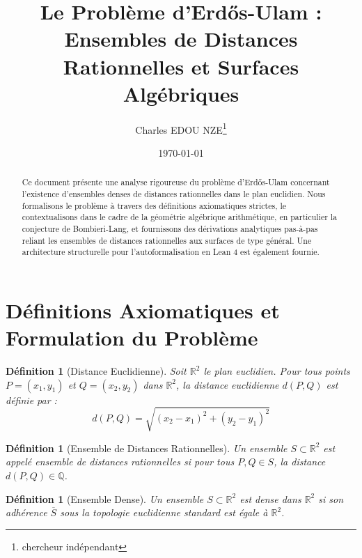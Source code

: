 \documentclass[12pt,a4paper]{article}
\title{Le Probl\`eme d'Erd\H{o}s-Ulam : Ensembles de Distances Rationnelles et Surfaces Alg\'ebriques}
\author{Charles EDOU NZE\thanks{chercheur ind\'ependant}}
\date{\today}
\newtheorem{definition}[theorem]{D\'efinition}
\begin{document}
\maketitle
\thispagestyle{fancy}
\fancyhf{}
\renewcommand{\headrulewidth}{0pt}

\begin{abstract}
Ce document pr\'esente une analyse rigoureuse du probl\`eme d'Erd\H{o}s-Ulam concernant l'existence d'ensembles denses de distances rationnelles dans le plan euclidien. Nous formalisons le probl\`eme \`a travers des d\'efinitions axiomatiques strictes, le contextualisons dans le cadre de la g\'eom\'etrie alg\'ebrique arithm\'etique, en particulier la conjecture de Bombieri-Lang, et fournissons des d\'erivations analytiques pas-\`a-pas reliant les ensembles de distances rationnelles aux surfaces de type g\'en\'eral. Une architecture structurelle pour l'autoformalisation en Lean 4 est \'egalement fournie.
\end{abstract}

\tableofcontents
\newpage

\section{D\'efinitions Axiomatiques et Formulation du Probl\`eme}

\begin{definition}[Distance Euclidienne]
Soit $\mathbb{R}^2$ le plan euclidien. Pour tous points $P = (x_1, y_1)$ et $Q = (x_2, y_2)$ dans $\mathbb{R}^2$, la distance euclidienne $d(P, Q)$ est d\'efinie par :
\begin{equation}
d(P, Q) = \sqrt{(x_2 - x_1)^2 + (y_2 - y_1)^2}
\end{equation}
\end{definition}

\begin{definition}[Ensemble de Distances Rationnelles]
Un ensemble $S \subset \mathbb{R}^2$ est appel\'e \textit{ensemble de distances rationnelles} si pour tous $P, Q \in S$, la distance $d(P, Q) \in \mathbb{Q}$.
\end{definition}

\begin{definition}[Ensemble Dense]
Un ensemble $S \subset \mathbb{R}^2$ est \textit{dense} dans $\mathbb{R}^2$ si son adh\'erence $\overline{S}$ sous la topologie euclidienne standard est \'egale \`a $\mathbb{R}^2$.
\end{definition}
\end{document}
